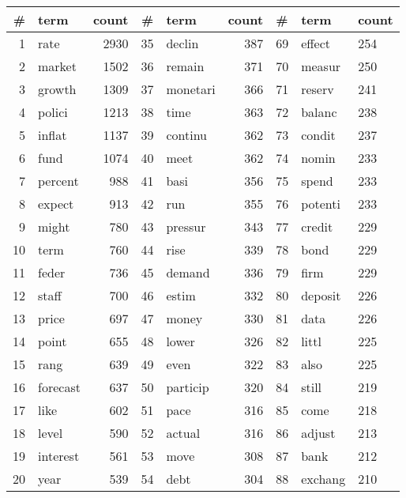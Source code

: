 \begin{tabular}{rlrrlrlll}
\toprule
  \# &      term & count &   \# &       term & count &    \# &       term & count \\
\midrule
  1 &      rate &  2930 &  35 &     declin &   387 &   69 &     effect &   254 \\
  2 &    market &  1502 &  36 &     remain &   371 &   70 &     measur &   250 \\
  3 &    growth &  1309 &  37 &   monetari &   366 &   71 &     reserv &   241 \\
  4 &    polici &  1213 &  38 &       time &   363 &   72 &     balanc &   238 \\
  5 &    inflat &  1137 &  39 &    continu &   362 &   73 &     condit &   237 \\
  6 &      fund &  1074 &  40 &       meet &   362 &   74 &      nomin &   233 \\
  7 &   percent &   988 &  41 &       basi &   356 &   75 &      spend &   233 \\
  8 &    expect &   913 &  42 &        run &   355 &   76 &    potenti &   233 \\
  9 &     might &   780 &  43 &    pressur &   343 &   77 &     credit &   229 \\
 10 &      term &   760 &  44 &       rise &   339 &   78 &       bond &   229 \\
 11 &     feder &   736 &  45 &     demand &   336 &   79 &       firm &   229 \\
 12 &     staff &   700 &  46 &      estim &   332 &   80 &    deposit &   226 \\
 13 &     price &   697 &  47 &      money &   330 &   81 &       data &   226 \\
 14 &     point &   655 &  48 &      lower &   326 &   82 &      littl &   225 \\
 15 &      rang &   639 &  49 &       even &   322 &   83 &       also &   225 \\
 16 &  forecast &   637 &  50 &   particip &   320 &   84 &      still &   219 \\
 17 &      like &   602 &  51 &       pace &   316 &   85 &       come &   218 \\
 18 &     level &   590 &  52 &     actual &   316 &   86 &     adjust &   213 \\
 19 &  interest &   561 &  53 &       move &   308 &   87 &       bank &   212 \\
 20 &      year &   539 &  54 &       debt &   304 &   88 &    exchang &   210 \\

\end{tabular}
